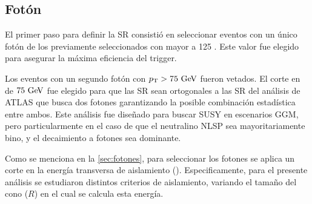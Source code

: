 

\subsection{Fotón}\label{sec:opt_ph_iso}

El primer paso para definir la SR consistió en seleccionar eventos con un único
fotón de los previamente seleccionados con {\pt} mayor a 125 \gev. Este valor
fue elegido para asegurar la máxima eficiencia del trigger.

Los eventos con un segundo fotón con $\pt > 75 \gev$ fueron vetados. El corte en
{\pt} de $75\gev$ fue elegido para que las SR sean ortogonales a las SR del
análisis de ATLAS que busca dos fotones\cite{ATLAS-CONF-2014-001} garantizando la
posible combinación estadística entre ambos. Este análisis fue diseñado para
buscar SUSY en escenarios GGM, pero particularmente en el caso de que el
neutralino NLSP sea mayoritariamente bino, y el decaimiento a fotones sea
dominante.



Como se menciona en la \cref{sec:fotones}, para seleccionar los fotones se
aplica un corte en la energía transversa de aislamiento (\etiso). Especificamente,
para el presente análisis se estudiaron distintos
criterios de aislamiento, variando el tamaño del cono ($R$) en el cual se
calcula esta energía.



